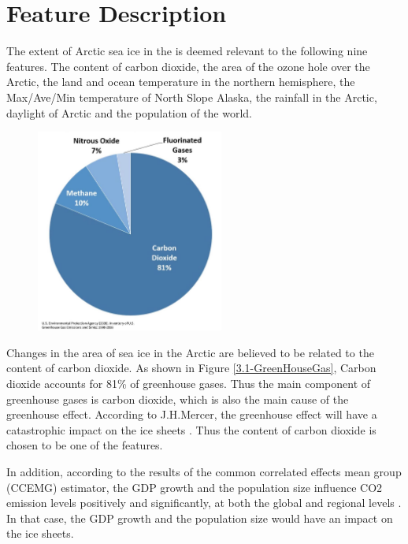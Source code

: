 \section{Feature Description} %

The extent of Arctic sea ice in the is deemed relevant to the following nine features. The content of carbon dioxide, the area of the ozone hole over the Arctic, the land and ocean temperature in the northern hemisphere, the Max/Ave/Min temperature of North Slope Alaska, the rainfall in the Arctic, daylight of Arctic and the population of the world.

\begin{figure}[htbp]
\center
\includegraphics[width = 0.55\textwidth]{Figure/3.1-GreenHouseGas.jpg}
\end{figure}

Changes in the area of sea ice in the Arctic are believed to be related to the content of carbon dioxide. As shown in Figure \ref{3.1-GreenHouseGas}, Carbon dioxide accounts for 81\% of greenhouse gases. Thus the main component of greenhouse gases is carbon dioxide, which is also the main cause of the greenhouse effect. According to J.H.Mercer, the greenhouse effect will have a catastrophic impact on the ice sheets \cite{mercer1978west}. Thus the content of carbon dioxide is chosen to be one of the features.

In addition, according to the results of the common correlated effects mean group (CCEMG) estimator, the GDP growth and the population size influence CO2 emission levels positively and significantly, at both the global and regional levels \cite{DONG2018180}. In that case, the GDP growth and the population size would have an impact on the ice sheets.

